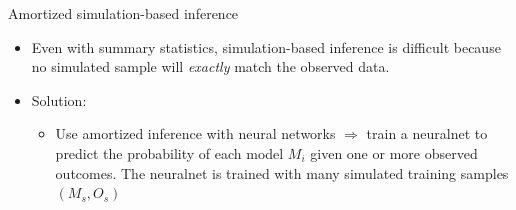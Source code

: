 \documentclass[10pt]{beamer}
\begin{document}
\begin{frame}{Amortized simulation-based inference}
    \begin{itemize}
        \item Even with summary statistics, simulation-based inference is difficult because no simulated sample will \textit{exactly} match the observed data.
        \item Solution:
        \begin{itemize}
            \item<2-> Use amortized inference with neural networks $\Rightarrow$ train a neuralnet to predict the probability of each model $M_i$ given one or more observed outcomes. The neuralnet is trained with many simulated training samples $(M_s, O_s)$ \citep{radev2021amortized}
        \end{itemize}
    \end{itemize}
\end{frame}
\end{document}
